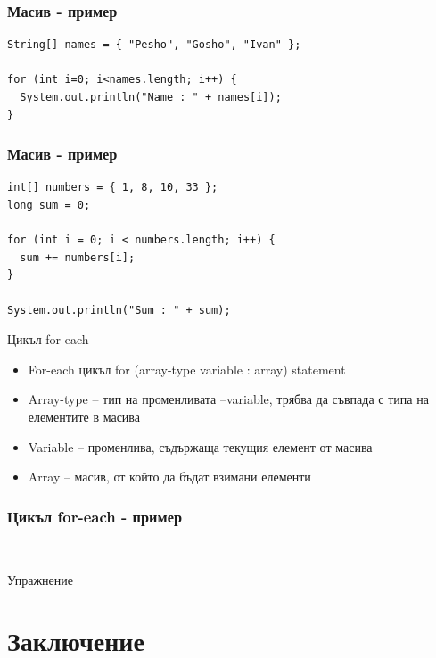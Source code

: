 \documentclass{beamer}
\begin{document}
\begin{frame}[fragile]
  \frametitle{Масив - пример}
  \transdissolve
\begin{lstlisting}
String[] names = { "Pesho", "Gosho", "Ivan" };

for (int i=0; i<names.length; i++) {
  System.out.println("Name : " + names[i]);
}
\end{lstlisting}
\end{frame}

\begin{frame}[fragile]
  \frametitle{Масив - пример}
  \transdissolve
\begin{lstlisting}
int[] numbers = { 1, 8, 10, 33 };
long sum = 0;

for (int i = 0; i < numbers.length; i++) {
  sum += numbers[i];
}

System.out.println("Sum : " + sum);
\end{lstlisting}
\end{frame}

\begin{frame}{Цикъл for-each}
  \transdissolve
  \begin{itemize}
  \item For-each цикъл
    for (array-type variable : array) statement

    \item Array-type – тип на променливата
    –variable, трябва да съвпада с типа на
    елементите в масива
    \item Variable – променлива, съдържаща
    текущия елемент от масива
    \item Array – масив, от който да бъдат
    взимани елементи

  \end{itemize}
\end{frame}

\begin{frame}[fragile]
  \frametitle{Цикъл for-each - пример}
  \transdissolve
\begin{lstlisting}
  
\end{lstlisting}
\end{frame}

\begin{frame}{Упражнение}
  \transdissolve  
\end{frame}

\section*{Заключение}
\end{document}
